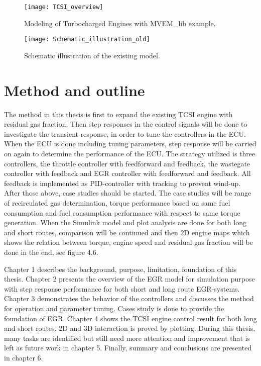 \begin{figure}
\texttt{[image: TCSI\_overview]} 
\label{fig:TCSI_overview}
\caption{Modeling of Turbocharged Engines with MVEM\_lib example.}
\end{figure}

\begin{figure}
\texttt{[image: Schematic\_illustration\_old]} 
\caption{Schematic illustration of the existing model.}
\end{figure}

\section{Method and outline}
The method in this thesis is first to expand the existing TCSI engine with residual gas fraction. Then step responses in the control signals will be done to investigate the transient response, in order to tune the controllers in the ECU. When the ECU is done including tuning parameters, step response will be carried on again to determine the performance of the ECU. The strategy utilized is three controllers, the throttle controller with feedforward and feedback, the wastegate controller with feedback and EGR controller with feedforward and feedback. All feedback is implemented as PID-controller with tracking to prevent wind-up. After those above, case studies should be started. The case studies will be range of recirculated gas determination, torque performance based on same fuel consumption and fuel consumption performance with respect to same torque generation.  When the Simulink model and plot analysis are done for both long and short routes, comparison will be continued and then 2D engine maps which shows the relation between torque, engine speed and residual gas fraction will be done in the end, see figure 4.6. 

Chapter 1 describes the background, purpose, limitation, foundation of this thesis. Chapter 2 presents the overview of the EGR model for simulation purpose with step response performance for both short and long route EGR-systems. Chapter 3 demonstrates the behavior of the controllers and discusses the method for operation and parameter tuning. Cases study is done to provide the foundation of EGR. Chapter 4 shows the TCSI engine control result for both long and short routes. 2D and 3D interaction is proved by plotting. During this thesis, many tasks are identified but still need more attention and improvement that is left as future work in chapter 5. Finally, summary and conclusions are presented in chapter 6.
